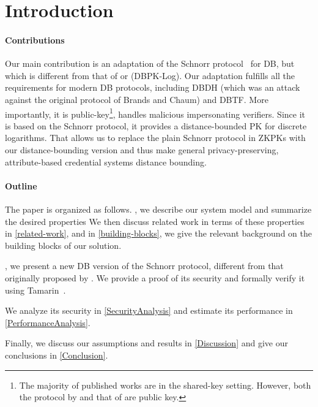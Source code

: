 \section{Introduction}%
\label{Introduction}

\paragraph*{Contributions}

Our main contribution is an adaptation of the Schnorr protocol~\cite{Schnorr} 
for \ac{DB}, but which is different from that of \textcite{DistanceBounding} or 
\textcite{Bussard-Bagga} (DBPK-Log).
Our adaptation fulfills all the requirements for modern \ac{DB} protocols, 
including \ac{DBDH} (which was an attack against the original protocol of 
Brands and Chaum) and \ac{DBTF}.
More importantly, it is public-key\footnote{%
  The majority of published works are in the shared-key setting.
  However, both the protocol by \textcite{DistanceBounding} and that of 
  \textcite{Bussard-Bagga} are public key.
}, handles malicious impersonating verifiers.
Since it is based on the Schnorr protocol, it provides a distance-bounded 
\ac{PK} for discrete logarithms.
That allows us to replace the plain Schnorr protocol in \acp{ZKPK} with our 
distance-bounding version and thus make general privacy-preserving, 
attribute-based credential systems distance bounding.

\paragraph*{Outline}

The paper is organized as follows.
, we describe our system model and summarize the desired 
properties 
We then discuss related work in terms of these properties in 
\cref{related-work}, and in \cref{building-blocks}, we give 
the relevant background on the building blocks of our solution.

, we present a new \ac{DB} version of the Schnorr protocol, 
different from that originally proposed by \textcite{DistanceBounding}.
We provide a proof of its security and formally verify it using 
Tamarin~\cite{TamarinDB}.

We analyze its security in \cref{SecurityAnalysis} and estimate its performance 
in \cref{PerformanceAnalysis}.

Finally, we discuss our assumptions and results in \cref{Discussion} and give 
our conclusions in \cref{Conclusion}.
